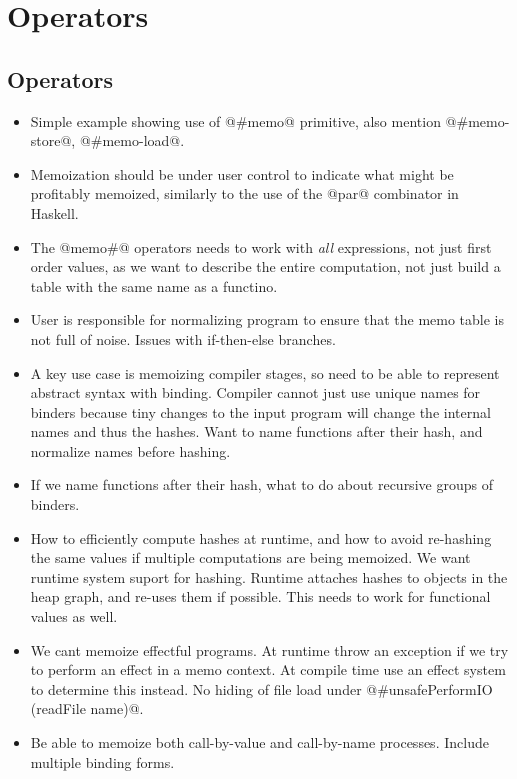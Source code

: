 \clearpage{}
\section{Operators}

\subsection{Operators}
\begin{itemize}
\item   Simple example showing use of @#memo@ primitive, also mention @#memo-store@, @#memo-load@.
\item   Memoization should be under user control to indicate what might be profitably memoized, similarly to the use of the @par@ combinator in Haskell. \cite{Trinder:1996:GUM}
\item   The @memo#@ operators needs to work with \emph{all} expressions, not just first order values, as we want to describe the entire computation, not just build a table with the same name as a functino.
\item   User is responsible for normalizing program to ensure that the memo table is not full of noise. Issues with if-then-else branches.
\item   A key use case is memoizing compiler stages, so need to be able to represent abstract syntax with binding. Compiler cannot just use unique names for binders because tiny changes to the input program will change the internal names and thus the hashes. Want to name functions after their hash, and normalize names before hashing.
\item   If we name functions after their hash, what to do about recursive groups of binders.
\item   How to efficiently compute hashes at runtime, and how to avoid re-hashing the same values if multiple computations are being memoized. We want runtime system suport for hashing. Runtime attaches hashes to objects in the heap graph, and re-uses them if possible. This needs to work for functional values as well.
\item   We cant memoize effectful programs. At runtime throw an exception if we try to perform an effect in a memo context. At compile time use an effect system to determine this instead. No hiding of file load under @#unsafePerformIO (readFile name)@.
\item   Be able to memoize both call-by-value and call-by-name processes. Include multiple binding forms.
\end{itemize}


